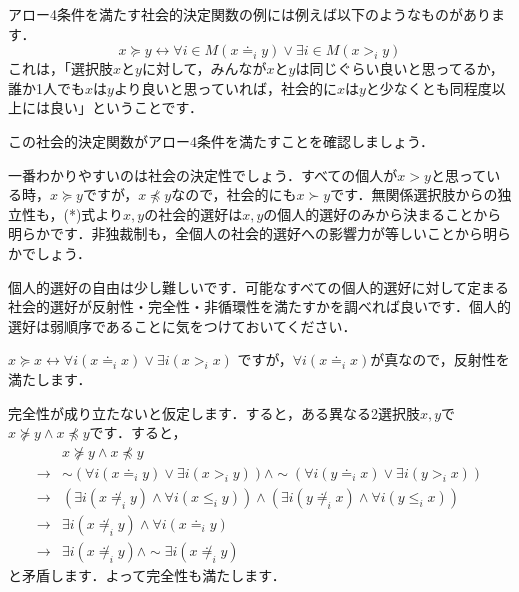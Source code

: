 アロー4条件を満たす社会的決定関数の例には例えば以下のようなものがあります．
\begin{equation}
    x \succeq y \leftrightarrow \forall i \in M (x \doteq_i y) \lor \exists i \in M (x >_i y) \tag{*}
\end{equation}
これは，「選択肢$x$と$y$に対して，みんなが$x$と$y$は同じぐらい良いと思ってるか，誰か1人でも$x$は$y$より良いと思っていれば，社会的に$x$は$y$と少なくとも同程度以上には良い」ということです．

この社会的決定関数がアロー4条件を満たすことを確認しましょう．

一番わかりやすいのは社会の決定性でしょう．すべての個人が$x > y$と思っている時，$x \succeq y$ですが，$x \not \preceq y$なので，社会的にも$x \succ y$です．無関係選択肢からの独立性も，(*)式より$x,y$の社会的選好は$x,y$の個人的選好のみから決まることから明らかです．非独裁制も，全個人の社会的選好への影響力が等しいことから明らかでしょう．

個人的選好の自由は少し難しいです．可能なすべての個人的選好に対して定まる社会的選好が反射性・完全性・非循環性を満たすかを調べれば良いです．個人的選好は弱順序であることに気をつけておいてください．

$x \succeq x \leftrightarrow \forall i (x \doteq_i x) \lor \exists i (x >_i x)$
ですが，$\forall i (x \doteq_i x)$が真なので，反射性を満たします．

完全性が成り立たないと仮定します．すると，ある異なる2選択肢$x,y$で$x \not \succeq y \land x \not \preceq y$です．すると，
\begin{align*}
    &x \not \succeq y \land x \not \preceq y \\
    \to & \sim (\forall i (x \doteq_i y) \lor \exists i (x >_i y)) \land \sim (\forall i (y \doteq_i x) \lor \exists i (y >_i x)) \\
    \to & (\exists i (x \not \doteq_i y) \land \forall i (x \leq_i y)) \land (\exists i (y \not \doteq_i x) \land \forall i (y \leq_i x))\\
    \to & \exists i (x \not \doteq_i y) \land \forall i (x \doteq_i y)\\
    \to & \exists i (x \not \doteq_i y) \land \sim \exists i (x \not \doteq_i y)
\end{align*}
と矛盾します．よって完全性も満たします．

